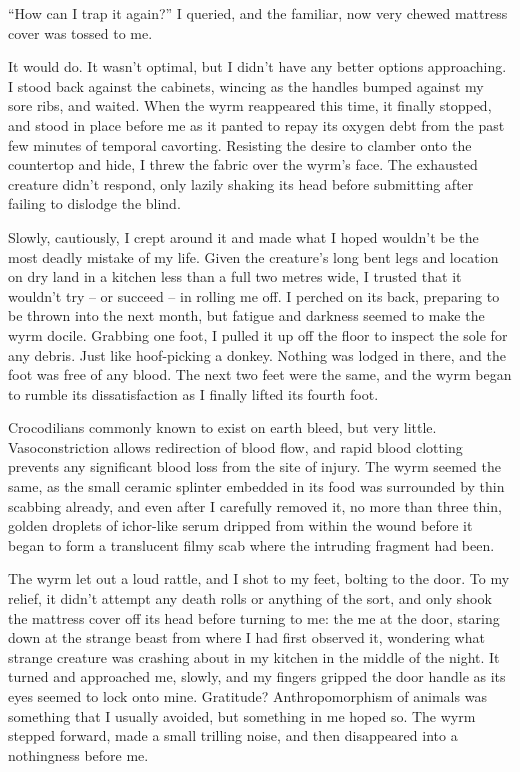 ``How can I trap it again?'' I queried, and the familiar, now very chewed mattress cover was tossed to me.

It would do. It wasn't optimal, but I didn't have any better options approaching. I stood back against the cabinets, wincing as the handles bumped against my sore ribs, and waited. When the wyrm reappeared this time, it finally stopped, and stood in place before me as it panted to repay its oxygen debt from the past few minutes of temporal cavorting. Resisting the desire to clamber onto the countertop and hide, I threw the fabric over the wyrm's face. The exhausted creature didn't respond, only lazily shaking its head before submitting after failing to dislodge the blind.

Slowly, cautiously, I crept around it and made what I hoped wouldn't be the most deadly mistake of my life. Given the creature's long bent legs and location on dry land in a kitchen less than a full two metres wide, I trusted that it wouldn't try – or succeed – in rolling me off. I perched on its back, preparing to be thrown into the next month, but fatigue and darkness seemed to make the wyrm docile. Grabbing one foot, I pulled it up off the floor to inspect the sole for any debris. Just like hoof-picking a donkey. Nothing was lodged in there, and the foot was free of any blood. The next two feet were the same, and the wyrm began to rumble its dissatisfaction as I finally lifted its fourth foot.

Crocodilians commonly known to exist on earth bleed, but very little. Vasoconstriction allows redirection of blood flow, and rapid blood clotting prevents any significant blood loss from the site of injury. The wyrm seemed the same, as the small ceramic splinter embedded in its food was surrounded by thin scabbing already, and even after I carefully removed it, no more than three thin, golden droplets of ichor-like serum dripped from within the wound before it began to form a translucent filmy scab where the intruding fragment had been.

The wyrm let out a loud rattle, and I shot to my feet, bolting to the door. To my relief, it didn't attempt any death rolls or anything of the sort, and only shook the mattress cover off its head before turning to me: the me at the door, staring down at the strange beast from where I had first observed it, wondering what strange creature was crashing about in my kitchen in the middle of the night. It turned and approached me, slowly, and my fingers gripped the door handle as its eyes seemed to lock onto mine. Gratitude? Anthropomorphism of animals was something that I usually avoided, but something in me hoped so. The wyrm stepped forward, made a small trilling noise, and then disappeared into a nothingness before me.

